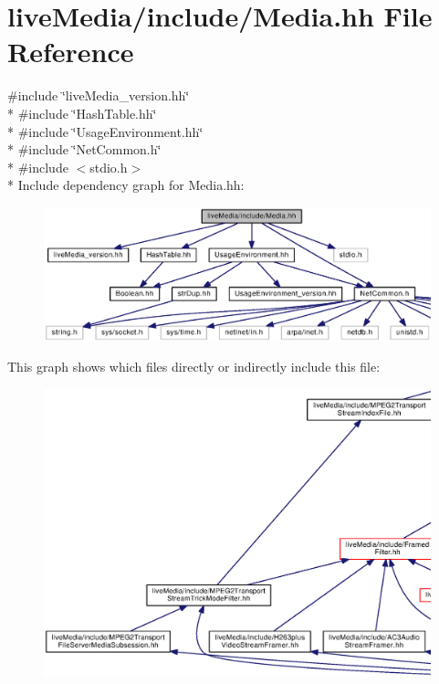 \section{live\+Media/include/\+Media.hh File Reference}
\label{Media_8hh}
{\ttfamily \#include \char`\"{}live\+Media\+\_\+version.\+hh\char`\"{}}\\*
{\ttfamily \#include \char`\"{}Hash\+Table.\+hh\char`\"{}}\\*
{\ttfamily \#include \char`\"{}Usage\+Environment.\+hh\char`\"{}}\\*
{\ttfamily \#include \char`\"{}Net\+Common.\+h\char`\"{}}\\*
{\ttfamily \#include $<$stdio.\+h$>$}\\*
Include dependency graph for Media.\+hh\+:
\nopagebreak
\begin{figure}[H]
\begin{center}
\leavevmode
\includegraphics[width=350pt]{Media_8hh__incl}
\end{center}
\end{figure}
This graph shows which files directly or indirectly include this file\+:
\nopagebreak
\begin{figure}[H]
\begin{center}
\leavevmode
\includegraphics[width=350pt]{Media_8hh__dep__incl}
\end{center}
\end{figure}
